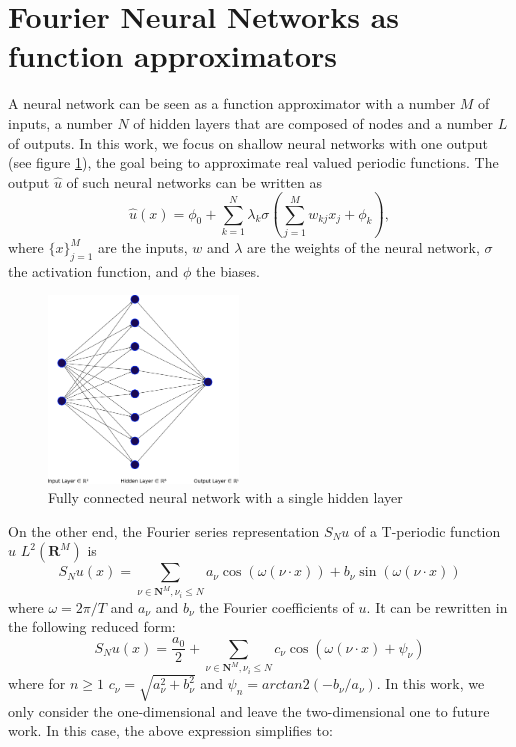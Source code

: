 \documentclass[11pt]{article}
\begin{document}
 





\section{Fourier Neural Networks as function approximators}\label{sec:fnn}
A neural network can be seen as a function approximator with a number $M$ of inputs, a number $N$ of hidden layers that are composed of nodes and a number $L$ of outputs. In this work, we focus on shallow neural networks with one output (see figure \ref{fig:NN_single}), the goal being to approximate real valued periodic functions. The output $\hat{u}$ of such neural networks  can be written as
\begin{equation}\label{Eq: NN}
  \hat{u}(x) = \phi_0 + \sum_{k = 1}^N \lambda_{k} \sigma\left(\sum_{j = 1}^M w_{kj}x_j + \phi_k \right),
\end{equation}
where $\{x\}_{j = 1}^M$ are the inputs, $w$ and $\lambda$ are the weights of the neural network, $\sigma$ the activation function, and $\phi$ the biases. 
\begin{figure}[htb]
    \centering
    \includegraphics[width=0.45\textwidth]{nn.eps}
    \caption{Fully connected neural network with a single hidden layer}
    \label{fig:NN_single}
\end{figure}
On the other end, the Fourier series representation $S_N u$ of a T-periodic function $u$ \in $L^2(\mathbf R^M)$ is
\begin{equation}\label{Eq: fourier}
    S_{N}u(x) = \sum_{\nu \in \mathbf{N}^M, \nu_{i}\leq N} a_{\nu} \cos(\omega (\nu\cdot x)) + b_{\nu} \sin(\omega(\nu\cdot x)) 
\end{equation}
where $\omega = 2\pi/T$ and $a_{\nu}$ and $b_{\nu}$ the Fourier coefficients of $u$. It can be rewritten in the following reduced form:
 \begin{equation}\label{Eq: fourier_shift}
     S_N u(x) = \frac{a_0}{2} + \sum_{\nu \in \mathbf{N}^M, \nu_{i}\leq N} c_{\nu} \cos(\omega (\nu\cdot x) + \psi_{\nu})
 \end{equation}
where for $n \geq 1$ $c_{\nu} = \sqrt{a_{\nu}^2 + b_{\nu}^2}$ and $\psi_n = arctan2(-b_{\nu}/a_{\nu})$. In this work, we only consider the one-dimensional and leave the two-dimensional one to future work. In this case, the above expression simplifies to:
\end{document}
